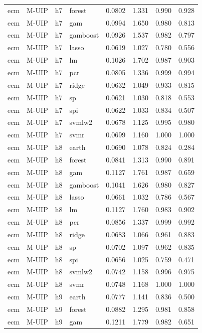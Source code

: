 \begin{ThreePartTable}
\begin{longtable}[t]{llclcccc}
ecm & M-UIP & h7 & forest & 0.0802 & 1.331 & 0.990 & 0.928\\
ecm & M-UIP & h7 & gam & 0.0994 & 1.650 & 0.980 & 0.813\\
ecm & M-UIP & h7 & gamboost & 0.0926 & 1.537 & 0.982 & 0.797\\
ecm & M-UIP & h7 & lasso & 0.0619 & 1.027 & 0.780 & 0.556\\
ecm & M-UIP & h7 & lm & 0.1026 & 1.702 & 0.987 & 0.903\\
ecm & M-UIP & h7 & pcr & 0.0805 & 1.336 & 0.999 & 0.994\\
ecm & M-UIP & h7 & ridge & 0.0632 & 1.049 & 0.933 & 0.815\\
ecm & M-UIP & h7 & sp & 0.0621 & 1.030 & 0.818 & 0.553\\
ecm & M-UIP & h7 & spi & 0.0622 & 1.033 & 0.834 & 0.507\\
ecm & M-UIP & h7 & svmlw2 & 0.0678 & 1.125 & 0.995 & 0.980\\
ecm & M-UIP & h7 & svmr & 0.0699 & 1.160 & 1.000 & 1.000\\
\addlinespace
ecm & M-UIP & h8 & earth & 0.0690 & 1.078 & 0.824 & 0.284\\
ecm & M-UIP & h8 & forest & 0.0841 & 1.313 & 0.990 & 0.891\\
ecm & M-UIP & h8 & gam & 0.1127 & 1.761 & 0.987 & 0.659\\
ecm & M-UIP & h8 & gamboost & 0.1041 & 1.626 & 0.980 & 0.827\\
ecm & M-UIP & h8 & lasso & 0.0661 & 1.032 & 0.786 & 0.567\\
ecm & M-UIP & h8 & lm & 0.1127 & 1.760 & 0.983 & 0.902\\
ecm & M-UIP & h8 & pcr & 0.0856 & 1.337 & 0.999 & 0.992\\
ecm & M-UIP & h8 & ridge & 0.0683 & 1.066 & 0.961 & 0.883\\
ecm & M-UIP & h8 & sp & 0.0702 & 1.097 & 0.962 & 0.835\\
ecm & M-UIP & h8 & spi & 0.0656 & 1.025 & 0.759 & 0.471\\
ecm & M-UIP & h8 & svmlw2 & 0.0742 & 1.158 & 0.996 & 0.975\\
ecm & M-UIP & h8 & svmr & 0.0748 & 1.168 & 1.000 & 1.000\\
\addlinespace
ecm & M-UIP & h9 & earth & 0.0777 & 1.141 & 0.836 & 0.500\\
ecm & M-UIP & h9 & forest & 0.0882 & 1.295 & 0.981 & 0.858\\
ecm & M-UIP & h9 & gam & 0.1211 & 1.779 & 0.982 & 0.651\\

\end{longtable}
\end{ThreePartTable}
